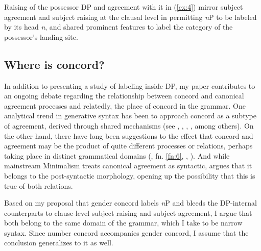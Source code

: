 \documentclass[output=paper
,modfonts
,nonflat]{langsci/langscibook}
\begin{document}
Raising of the possessor DP and agreement with it in (\ref{ex:4}) mirror subject agreement and subject raising at the clausal level in permitting \textit{n}P to be labeled by its head \textit{n}, and shared prominent features to label the category of the possessor's landing site. 

\subsection{Where is concord?} \label{sec:1.2}
In addition to presenting a study of labeling inside DP, my paper contributes to an ongoing debate regarding the relationship between concord and canonical agreement processes and relatedly, the place of concord in the grammar. One analytical trend in generative syntax has been to approach concord as a subtype of agreement, derived through shared mechanisms (see \citealt{Baker2008}, \citealt{Carstens1991, Carstens2000, Carstens2011}, \citealt{Danon2011}, \citealt{Koopman2006}, \citealt{Toosarvandani_Van_Urk2014} among others). On the other hand, there have long been suggestions to the effect that concord and agreement may be the product of quite different processes or relations, perhaps taking place in distinct grammatical domains (\citealt{Baier2015}, \citealt{Chomsky2001} fn. \ref{fn:6}, \citealt{Chung2013}, \citealt{Norris2014}). And while mainstream Minimalism treats canonical agreement as syntactic, \citet{Bobaljik2008} argues that it belongs to the post-syntactic morphology, opening up the possibility that this is true of both relations. 

Based on my proposal that gender concord labels \textit{n}P and bleeds the DP-internal counterparts to clause-level subject raising and subject agreement, I argue that both belong to the same domain of the grammar, which I take to be narrow syntax. Since number concord accompanies gender concord, I assume that the conclusion generalizes to it as well. 
\end{document}
